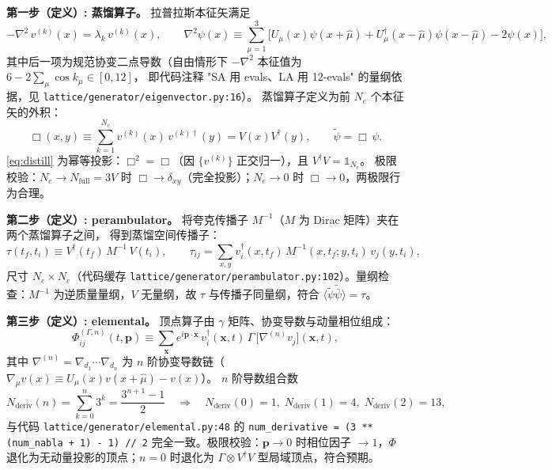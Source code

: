 \documentclass[UTF8]{ctexart}
\begin{document}
\textbf{第一步（定义）: 蒸馏算子。} 拉普拉斯本征矢满足
\begin{equation}\label{eq:laplace}
-\nabla^2\, v^{(k)}(x) = \lambda_k\, v^{(k)}(x),\qquad
\nabla^2\psi(x) \equiv \sum_{\mu=1}^{3}\Big[U_\mu(x)\psi(x+\hat{\mu}) + U_\mu^\dagger(x-\hat{\mu})\psi(x-\hat{\mu}) - 2\psi(x)\Big],
\end{equation}
其中后一项为规范协变二点导数（自由情形下 $-\nabla^2$ 本征值为 $6-2\sum_\mu\cos k_\mu \in [0,12]$，
即代码注释 "SA 用 evals、LA 用 12-evals" 的量纲依据，见 \texttt{lattice/generator/eigenvector.py:16}）。
蒸馏算子定义为前 $N_e$ 个本征矢的外积：
\begin{equation}\label{eq:distill}
\Box(x,y) \equiv \sum_{k=1}^{N_e} v^{(k)}(x)\, v^{(k)\dagger}(y) = V(x)V^\dagger(y),\qquad
\tilde{\psi} = \Box\,\psi .
\end{equation}
\eqref{eq:distill} 为幂等投影：$\Box^2=\Box$（因 $\{v^{(k)}\}$ 正交归一），且 $V^\dagger V = \mathbb{1}_{N_e}$。
极限校验：$N_e \to N_{\text{full}} = 3V$ 时 $\Box \to \delta_{xy}$（完全投影）；$N_e \to 0$ 时 $\Box\to 0$，两极限行为合理。

\textbf{第二步（定义）: perambulator。} 将夸克传播子 $M^{-1}$（$M$ 为 Dirac 矩阵）夹在两个蒸馏算子之间，
得到蒸馏空间传播子：
\begin{equation}\label{eq:peram}
\tau(t_f,t_i) \equiv V^\dagger(t_f)\, M^{-1}\, V(t_i),\qquad
\tau_{ij} = \sum_{x,y} v_i^\dagger(x,t_f)\, M^{-1}(x,t_f; y,t_i)\, v_j(y,t_i),
\end{equation}
尺寸 $N_e \times N_e$（代码缓存 \texttt{lattice/generator/perambulator.py:102}）。量纲检查：$M^{-1}$
为逆质量量纲，$V$ 无量纲，故 $\tau$ 与传播子同量纲，符合 $\langle \tilde\psi \tilde{\bar\psi}\rangle = \tau$。

\textbf{第三步（定义）: elemental。} 顶点算子由 $\gamma$ 矩阵、协变导数与动量相位组成：
\begin{equation}\label{eq:elemental}
\Phi^{(\Gamma,n)}_{ij}(t,\mathbf{p}) \equiv \sum_{\mathbf{x}} e^{i\mathbf{p}\cdot\mathbf{x}}\,
v_i^\dagger(\mathbf{x},t)\, \Gamma\, \big[\nabla^{(n)} v_j\big](\mathbf{x},t),
\end{equation}
其中 $\nabla^{(n)} = \nabla_{d_1}\cdots\nabla_{d_n}$ 为 $n$ 阶协变导数链（$\nabla_\mu v(x) \equiv U_\mu(x)v(x+\hat\mu) - v(x)$）。
$n$ 阶导数组合数
\begin{equation}\label{eq:nderiv}
N_{\text{deriv}}(n) = \sum_{k=0}^{n} 3^{k} = \frac{3^{n+1}-1}{2}
\quad\Rightarrow\quad N_{\text{deriv}}(0)=1,\; N_{\text{deriv}}(1)=4,\; N_{\text{deriv}}(2)=13,
\end{equation}
与代码 \texttt{lattice/generator/elemental.py:48} 的 \texttt{num\_derivative = (3 ** (num\_nabla + 1) - 1) // 2}
完全一致。极限校验：$\mathbf{p}\to 0$ 时相位因子 $\to 1$，$\Phi$ 退化为无动量投影的顶点；$n=0$ 时退化为
$\Gamma\otimes V^\dagger V$ 型局域顶点，符合预期。
\end{document}
